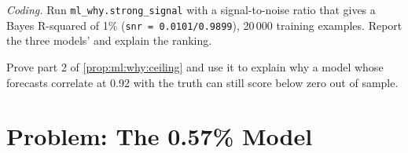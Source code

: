\begin{exercise}[$\star\star\star$]\label{exo:ml:why-financial-machine-learning-is-different:7}
\emph{Coding.} Run \texttt{ml\_why.strong\_signal} with a signal-to-noise ratio that gives a Bayes R-squared of 1\%
(\texttt{snr = 0.0101/0.9899}), 20\,000 training examples. Report the three models'  and explain
the ranking.
\end{exercise}

\begin{exercise}[$\star\star\star$]\label{exo:ml:why-financial-machine-learning-is-different:8}
Prove part 2 of \cref{prop:ml:why:ceiling} and use it to explain why a model whose forecasts correlate at 0.92 with
the truth can still score below zero out of sample.
\end{exercise}

\section{Problem: The 0.57\% Model}

